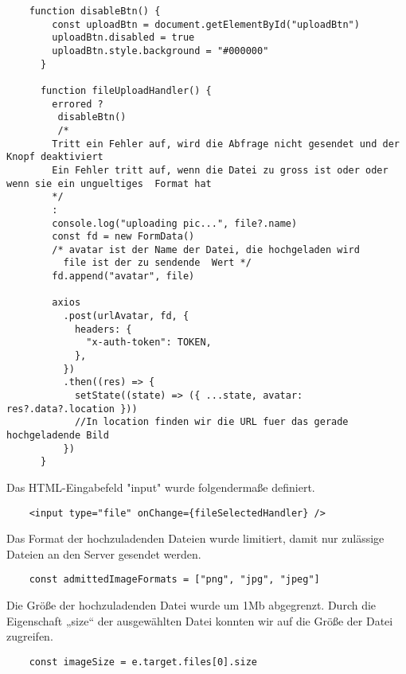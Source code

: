 \begin{lstlisting}
    function disableBtn() {
        const uploadBtn = document.getElementById("uploadBtn")
        uploadBtn.disabled = true
        uploadBtn.style.background = "#000000"
      }
    
      function fileUploadHandler() {
        errored ? 
         disableBtn()
         /*
        Tritt ein Fehler auf, wird die Abfrage nicht gesendet und der Knopf deaktiviert 
        Ein Fehler tritt auf, wenn die Datei zu gross ist oder oder wenn sie ein ungueltiges  Format hat
        */
        :
        console.log("uploading pic...", file?.name)
        const fd = new FormData()
        /* avatar ist der Name der Datei, die hochgeladen wird
          file ist der zu sendende  Wert */
        fd.append("avatar", file)  
    
        axios
          .post(urlAvatar, fd, {
            headers: {
              "x-auth-token": TOKEN,
            },
          })
          .then((res) => {
            setState((state) => ({ ...state, avatar: res?.data?.location }))    
            //In location finden wir die URL fuer das gerade hochgeladende Bild 
          })
      }\end{lstlisting}

Das HTML-Eingabefeld "input" wurde folgendermaße definiert.
\begin{lstlisting}
    <input type="file" onChange={fileSelectedHandler} />
\end{lstlisting}


Das Format der hochzuladenden Dateien wurde limitiert, damit nur zulässige Dateien an den Server gesendet werden.
\begin{lstlisting}
    const admittedImageFormats = ["png", "jpg", "jpeg"]
\end{lstlisting}

Die Größe der hochzuladenden Datei wurde um 1Mb abgegrenzt.
Durch die Eigenschaft „size“ der ausgewählten Datei konnten wir auf die Größe der Datei zugreifen.
\begin{lstlisting}
    const imageSize = e.target.files[0].size
\end{lstlisting}